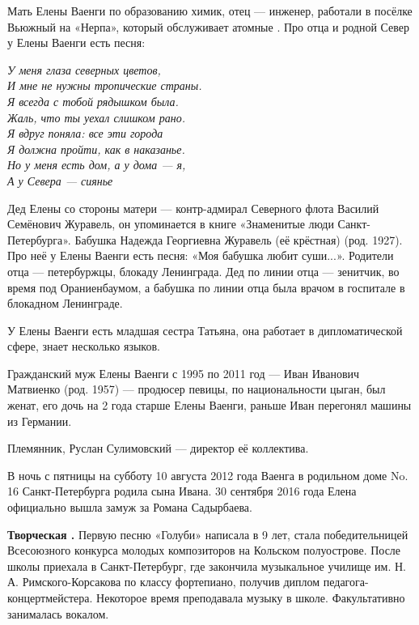 Мать Елены Ваенги по образованию химик, отец --- инженер, работали в посёлке Вьюжный на  «Нерпа», который обслуживает атомные . Про отца и родной Север у Елены Ваенги есть песня:

{\it У меня глаза северных цветов,\\
И мне не нужны тропические страны.\\
Я всегда с тобой рядышком была.\\
Жаль, что ты уехал слишком рано.\\
Я вдруг поняла: все эти города\\
Я должна пройти, как в наказанье.\\
Но у меня есть дом, а у дома --- я,\\
А у Севера --- сиянье}

Дед Елены со стороны матери --- контр-адмирал Северного флота Василий Семёнович Журавель, он упоминается в книге «Знаменитые люди Санкт-Петербурга». Бабушка Надежда Георгиевна Журавель (её крёстная) (род. 1927). Про неё у Елены Ваенги есть песня: «Моя бабушка любит суши...». Родители отца ---  петербуржцы,  блокаду Ленинграда. Дед по линии отца --- зенитчик, во время   под Ораниенбаумом, а бабушка по линии отца была врачом в госпитале в блокадном Ленинграде.

У Елены Ваенги есть младшая сестра Татьяна, она работает в дипломатической сфере, знает несколько языков.

Гражданский муж Елены Ваенги  с 1995 по 2011 год --- Иван Иванович Матвиенко (род. 1957) --- продюсер певицы, по национальности цыган, был женат, его дочь на 2 года старше Елены Ваенги, раньше Иван перегонял машины из Германии.

Племянник, Руслан Сулимовский --- директор её коллектива.

В ночь с пятницы на субботу 10 августа 2012 года Ваенга в родильном доме No. 16 Санкт-Петербурга родила сына Ивана. 30 сентября 2016 года Елена официально вышла замуж за Романа Садырбаева.

\textbf{Творческая .} Первую песню «Голуби» написала в 9 лет, стала победительницей Всесоюзного конкурса молодых композиторов на Кольском полуострове. После школы приехала в Санкт-Петербург, где закончила музыкальное училище им. Н. А. Римского-Корсакова по классу фортепиано, получив диплом педагога-концертмейстера. Некоторое время преподавала музыку в школе. Факультативно занималась вокалом.

